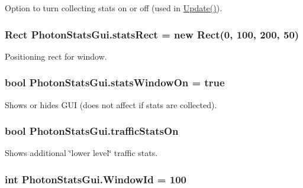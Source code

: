 Option to turn collecting stats on or off (used in \hyperlink{class_photon_stats_gui_a222bbb9f4b1c640489101a5f3bcada8a}{Update()}).

\subsubsection[{\texorpdfstring{stats\+Rect}{statsRect}}]{\setlength{\rightskip}{0pt plus 5cm}Rect Photon\+Stats\+Gui.\+stats\+Rect = new Rect(0, 100, 200, 50)}\hypertarget{class_photon_stats_gui_af9e7598de2be45c63c6368727bb60ae5}{}\label{class_photon_stats_gui_af9e7598de2be45c63c6368727bb60ae5}


Positioning rect for window.

\subsubsection[{\texorpdfstring{stats\+Window\+On}{statsWindowOn}}]{\setlength{\rightskip}{0pt plus 5cm}bool Photon\+Stats\+Gui.\+stats\+Window\+On = true}\hypertarget{class_photon_stats_gui_aac6e6189d7a7723ef4fbcbb5c7a6b6e8}{}\label{class_photon_stats_gui_aac6e6189d7a7723ef4fbcbb5c7a6b6e8}


Shows or hides G\+UI (does not affect if stats are collected).

\subsubsection[{\texorpdfstring{traffic\+Stats\+On}{trafficStatsOn}}]{\setlength{\rightskip}{0pt plus 5cm}bool Photon\+Stats\+Gui.\+traffic\+Stats\+On}\hypertarget{class_photon_stats_gui_ac8015189e49ffdb616367c7d9f9e91db}{}\label{class_photon_stats_gui_ac8015189e49ffdb616367c7d9f9e91db}


Shows additional \char`\"{}lower level\char`\"{} traffic stats.

\subsubsection[{\texorpdfstring{Window\+Id}{WindowId}}]{\setlength{\rightskip}{0pt plus 5cm}int Photon\+Stats\+Gui.\+Window\+Id = 100}\hypertarget{class_photon_stats_gui_a9e96e77b74435c5ff2eeccf2d409685f}{}\label{class_photon_stats_gui_a9e96e77b74435c5ff2eeccf2d409685f}


